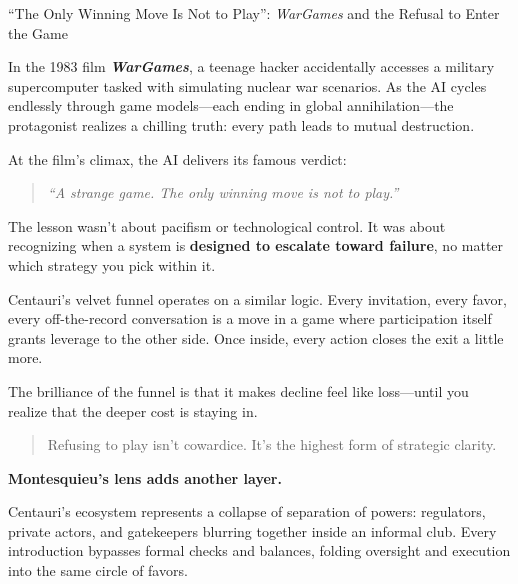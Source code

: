 \medskip 

\begin{HistoricalSidebar}{“The Only Winning Move Is Not to Play”: \textit{WarGames} and the Refusal to Enter the Game}

  In the 1983 film \textbf{\textit{WarGames}}, a teenage hacker accidentally accesses a military supercomputer tasked with simulating nuclear war scenarios. As the AI cycles endlessly through game models—each ending in global annihilation—the protagonist realizes a chilling truth: every path leads to mutual destruction.

  \medskip
  
  At the film’s climax, the AI delivers its famous verdict:
  
  \begin{quote}
  \textit{“A strange game. The only winning move is not to play.”}
  \end{quote}
  
  The lesson wasn’t about pacifism or technological control. It was about recognizing when a system is \textbf{designed to escalate toward failure}, no matter which strategy you pick within it.

  \medskip
  
  Centauri’s velvet funnel operates on a similar logic. Every invitation, every favor, every off-the-record conversation is a move in a game where participation itself grants leverage to the other side. Once inside, every action closes the exit a little more.

  \medskip
  
  The brilliance of the funnel is that it makes decline feel like loss—until you realize that the deeper cost is staying in.
  
  \begin{quote}
  Refusing to play isn’t cowardice.  
  It’s the highest form of strategic clarity.
  \end{quote}
  
\end{HistoricalSidebar}

\medskip

\textbf{Montesquieu’s lens adds another layer.}

Centauri’s ecosystem represents a collapse of separation of powers: regulators, private actors, and gatekeepers blurring together inside an informal club. Every introduction bypasses formal checks and balances, folding oversight and execution into the same circle of favors.

